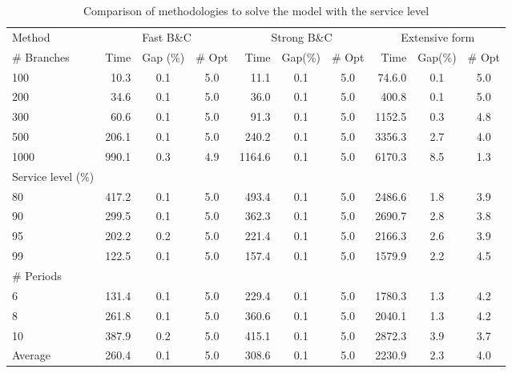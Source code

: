 \documentclass[10pt]{article}
\begin{document}
\begin{table}[H]
\caption{Comparison of methodologies to solve the model with the service level}
\label{tab:MethodologyCompare}
\begin{tabular}{lrccrccrcc}
\toprule
Method      & \multicolumn{3}{c}{Fast B\&C} & \multicolumn{3}{c}{Strong B\&C} & \multicolumn{3}{c}{Extensive form} \\
\# Branches & Time       & Gap (\%)       & \# Opt    & Time      & Gap(\%)     & \# Opt   & Time    & Gap(\%)     & \# Opt   \\
\cmidrule(lr){1-1}
\cmidrule(lr){2-4}
\cmidrule(lr){5-7}
\cmidrule(lr){8-10}
100	&	10.3	&	0.1	&	5.0	&	11.1	&	0.1	&	5.0	&	74.6.0	&	0.1	&	5.0	\\
200	&	34.6	&	0.1	&	5.0	&	36.0	&	0.1	&	5.0	&	400.8	&	0.1	&	5.0	\\
300	&	60.6	&	0.1	&	5.0	&	91.3	&	0.1	&	5.0	&	1152.5	&	0.3	&	4.8	\\
500	&	206.1	&	0.1	&	5.0	&	240.2	&	0.1	&	5.0	&	3356.3	&	2.7	&	4.0	\\
1000	&	990.1	&	0.3	&	4.9	&	1164.6	&	0.1	&	5.0	&	6170.3	&	8.5	&	1.3	\\
\midrule
Service level (\%) &&&&&&&&&\\
80&	417.2	&	0.1	&	5.0	&	493.4	&	0.1	&	5.0	&	2486.6	&	1.8	&	3.9	\\
90&	299.5	&	0.1	&	5.0	&	362.3	&	0.1	&	5.0	&	2690.7	&	2.8	&	3.8	\\
95&	202.2	&	0.2	&	5.0	&	221.4	&	0.1	&	5.0	&	2166.3	&	2.6	&	3.9	\\
99&	122.5	&	0.1	&	5.0	&	157.4	&	0.1	&	5.0	&	1579.9	&	2.2	&	4.5	\\
\midrule
\# Periods &&&&&&&&&\\
6	&	131.4	&	0.1	&	5.0	&	229.4	&	0.1	&	5.0	&	1780.3	&	1.3	&	4.2	\\
8	&	261.8	&	0.1	&	5.0	&	360.6	&	0.1	&	5.0	&	2040.1	&	1.3	&	4.2	\\
10	&	387.9	&	0.2	&	5.0	&	415.1	&	0.1	&	5.0	&	2872.3	&	3.9	&	3.7	\\
\midrule
Average &	260.4	&	0.1	&	5.0	&	308.6	&	0.1	&	5.0	&	2230.9	&	2.3	&	4.0	\\
\bottomrule
\end{tabular}

\end{table}
\end{document}
